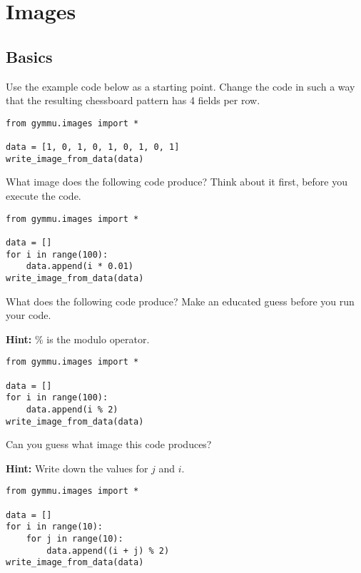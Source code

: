 \documentclass[11pt,a4paper]{report}
\begin{document}
\section{Images}

\subsection{Basics}

\begin{ex}
Use the example code below as a starting point. Change the code in such a way
that the resulting chessboard pattern has 4 fields per row.

\begin{lstlisting}
from gymmu.images import *

data = [1, 0, 1, 0, 1, 0, 1, 0, 1]
write_image_from_data(data)
\end{lstlisting}
\end{ex}

\begin{ex}
What image does the following code produce? Think about it first, before you
execute the code.

\begin{lstlisting}
from gymmu.images import *

data = []
for i in range(100):
    data.append(i * 0.01)
write_image_from_data(data)
\end{lstlisting}
\end{ex}

\begin{ex}
What does the following code produce? Make an educated guess before you run
your code.

\textbf{Hint:} \% is the modulo operator.


\begin{lstlisting}
from gymmu.images import *

data = []
for i in range(100):
    data.append(i % 2)
write_image_from_data(data)
\end{lstlisting}
\end{ex}

\begin{ex}
Can you guess what image this code produces?

\textbf{Hint:} Write down the values for $j$ and $i$.

\begin{lstlisting}
from gymmu.images import *

data = []
for i in range(10):
    for j in range(10):
        data.append((i + j) % 2)
write_image_from_data(data)
\end{lstlisting}
\end{ex}
\end{document}
